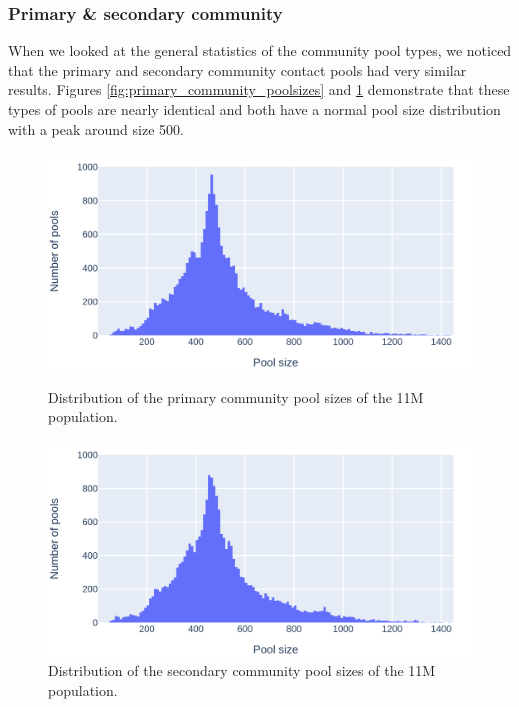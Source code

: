 \subsubsection{Primary \& secondary community}
When we looked at the general statistics of the community pool types, we noticed that the primary and secondary community contact pools had very similar results. Figures \ref{fig:primary_community_poolsizes} and \ref{fig:secondary_cumminity_poolsizes} demonstrate that these types of pools are nearly identical and both have a normal pool size distribution with a peak around size 500.

\begin{figure}
    \centering
    \begin{minipage}[b]{0.48\textwidth}
        \includegraphics[width=\textwidth]{3 - Stride/fig/primary_community_poolsizes.png}
        \caption{Distribution of the primary community pool sizes of the 11M population.}
        \label{fig:primary_community_poolsizes}
    \end{minipage}
    \hfill
    \begin{minipage}[b]{0.48\textwidth}
        \includegraphics[width=\textwidth]{3 - Stride/fig/secondary_community_poolsizes.png}
        \caption{Distribution of the secondary community pool sizes of the 11M population.}
        \label{fig:secondary_cumminity_poolsizes}
    \end{minipage}
\end{figure}

